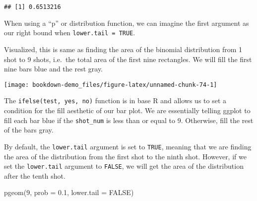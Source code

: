 \documentclass[
]{book}
\newenvironment{Shaded}{\begin{snugshade}}{\end{snugshade}}
\newcommand{\AttributeTok}[1]{\textcolor[rgb]{0.77,0.63,0.00}{#1}}
\newcommand{\CommentTok}[1]{\textcolor[rgb]{0.56,0.35,0.01}{\textit{#1}}}
\newcommand{\ConstantTok}[1]{\textcolor[rgb]{0.00,0.00,0.00}{#1}}
\newcommand{\DecValTok}[1]{\textcolor[rgb]{0.00,0.00,0.81}{#1}}
\newcommand{\FloatTok}[1]{\textcolor[rgb]{0.00,0.00,0.81}{#1}}
\newcommand{\FunctionTok}[1]{\textcolor[rgb]{0.00,0.00,0.00}{#1}}
\newcommand{\NormalTok}[1]{#1}
\newcommand{\SpecialCharTok}[1]{\textcolor[rgb]{0.00,0.00,0.00}{#1}}
\newcommand{\StringTok}[1]{\textcolor[rgb]{0.31,0.60,0.02}{#1}}
\begin{document}
\begin{verbatim}
## [1] 0.6513216
\end{verbatim}

When using a ``p'' or distribution function, we can imagine the first argument as our right bound when \texttt{lower.tail\ =\ TRUE}.

Visualized, this is same as finding the area of the binomial distribution from 1 shot to 9 shots, i.e.~the total area of the first nine rectangles. We will fill the first nine bars blue and the rest gray.

\begin{Shaded}
\end{Shaded}

\begin{center}\texttt{[image: bookdown-demo\_files/figure-latex/unnamed-chunk-74-1]} \end{center}

The \texttt{ifelse(test,\ yes,\ no)} function is in base R and allows us to set a condition for the fill aesthetic of our bar plot. We are essentially telling ggplot to fill each bar blue if the \texttt{shot\_num} is less than or equal to 9. Otherwise, fill the rest of the bars gray.

By default, the \texttt{lower.tail} argument is set to \texttt{TRUE}, meaning that we are finding the area of the distribution from the first shot to the ninth shot. However, if we set the \texttt{lower.tail} argument to \texttt{FALSE}, we will get the area of the distribution after the tenth shot.

\begin{Shaded}
\begin{Highlighting}[]
\FunctionTok{pgeom}\NormalTok{(}\DecValTok{9}\NormalTok{, }\AttributeTok{prob =} \FloatTok{0.1}\NormalTok{, }\AttributeTok{lower.tail =} \ConstantTok{FALSE}\NormalTok{)}
\end{Highlighting}
\end{Shaded}
\end{document}
